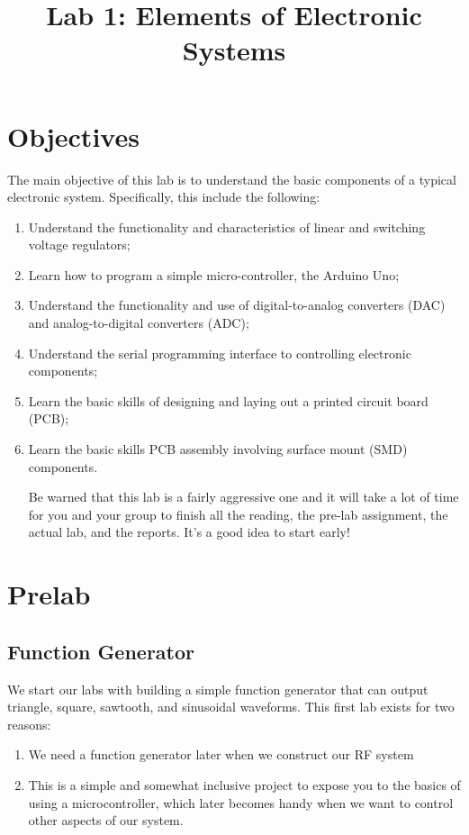 \documentclass[letterpaper, 11pt]{article}
\begin{document}
\title{Lab 1: Elements of Electronic Systems}
\date{}

\maketitle

\section{Objectives}
The main objective of this lab is to understand the basic components of a typical electronic system. Specifically, this include the following:
\begin{enumerate}
\item Understand the functionality and characteristics of linear and switching voltage regulators;
\item Learn how to program a simple micro-controller, the Arduino Uno;
\item Understand the functionality and use of digital-to-analog converters (DAC) and analog-to-digital converters (ADC);
\item Understand the serial programming interface to controlling electronic components;
\item Learn the basic skills of designing and laying out a printed circuit board (PCB);
\item Learn the basic skills PCB assembly involving surface mount (SMD) components.

Be warned that this lab is a fairly aggressive one and it will take a lot of time for you and your group to finish all the reading, the pre-lab assignment, the actual lab, and the reports. It's a good idea to start early!
\end{enumerate}

\section{Prelab}

\subsection{Function Generator}
We start our labs with building a simple function generator that can output triangle, square, sawtooth, and sinusoidal waveforms. This first lab exists for two reasons:
\begin{enumerate}
	\item We need a function generator later when we construct our RF system
	\item This is a simple and somewhat inclusive project to expose you to the basics of using a microcontroller, which later becomes handy when we want to control other aspects of our system. 
\end{enumerate}
\end{document}
